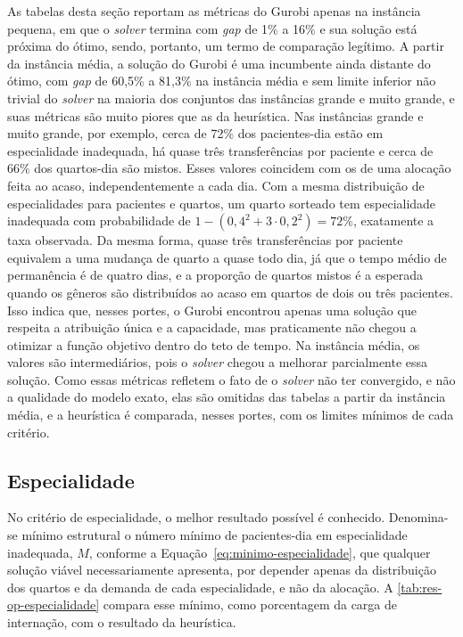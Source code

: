 As tabelas desta seção reportam as métricas do Gurobi apenas na instância pequena, em que o \textit{solver} termina com \textit{gap} de 1\% a 16\% e sua solução está próxima do ótimo, sendo, portanto, um termo de comparação legítimo. A partir da instância média, a solução do Gurobi é uma incumbente ainda distante do ótimo, com \textit{gap} de 60,5\% a 81,3\% na instância média e sem limite inferior não trivial do \textit{solver} na maioria dos conjuntos das instâncias grande e muito grande, e suas métricas são muito piores que as da heurística. Nas instâncias grande e muito grande, por exemplo, cerca de 72\% dos pacientes-dia estão em especialidade inadequada, há quase três transferências por paciente e cerca de 66\% dos quartos-dia são mistos. Esses valores coincidem com os de uma alocação feita ao acaso, independentemente a cada dia. Com a mesma distribuição de especialidades para pacientes e quartos, um quarto sorteado tem especialidade inadequada com probabilidade de $1 - (0{,}4^2 + 3 \cdot 0{,}2^2) = 72\%$, exatamente a taxa observada. Da mesma forma, quase três transferências por paciente equivalem a uma mudança de quarto a quase todo dia, já que o tempo médio de permanência é de quatro dias, e a proporção de quartos mistos é a esperada quando os gêneros são distribuídos ao acaso em quartos de dois ou três pacientes. Isso indica que, nesses portes, o Gurobi encontrou apenas uma solução que respeita a atribuição única e a capacidade, mas praticamente não chegou a otimizar a função objetivo dentro do teto de tempo. Na instância média, os valores são intermediários, pois o \textit{solver} chegou a melhorar parcialmente essa solução. Como essas métricas refletem o fato de o \textit{solver} não ter convergido, e não a qualidade do modelo exato, elas são omitidas das tabelas a partir da instância média, e a heurística é comparada, nesses portes, com os limites mínimos de cada critério.

\subsection{Especialidade}
\label{sec:res-op-especialidade}

No critério de especialidade, o melhor resultado possível é conhecido. Denomina-se mínimo estrutural o número mínimo de pacientes-dia em especialidade inadequada, $M$, conforme a Equação~\eqref{eq:minimo-especialidade}, que qualquer solução viável necessariamente apresenta, por depender apenas da distribuição dos quartos e da demanda de cada especialidade, e não da alocação. A \autoref{tab:res-op-especialidade} compara esse mínimo, como porcentagem da carga de internação, com o resultado da heurística.

